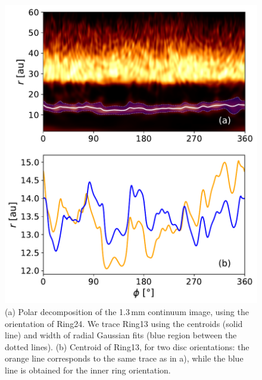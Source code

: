 \documentclass[letters,usenatbib,times]{mnras}
\begin{document}
\begin{figure}
    \includegraphics[width=\columnwidth]{polar_ring_aprox_and_diff_inner.pdf}
    \caption{(a) Polar decomposition of the 1.3\,mm continuum image, using the orientation of Ring24. We  trace Ring13 using the centroids  (solid line) and width of radial Gaussian fits  (blue region between the dotted lines). (b) Centroid of Ring13, for two disc orientations: the orange line corresponds to the same trace as in a), while the  blue line is  obtained for the inner ring orientation.}
    \label{fig:polarring}
\end{figure}
\end{document}
